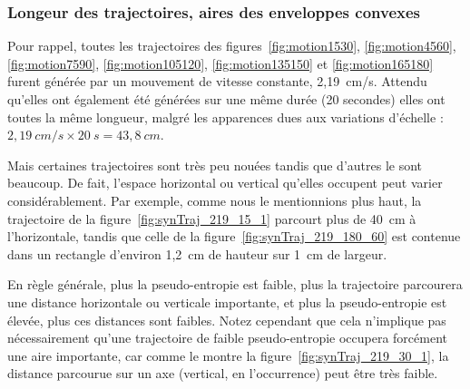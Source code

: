 	\subsubsection{Longeur des trajectoires, aires des enveloppes convexes}
	Pour rappel, toutes les trajectoires des figures~\ref{fig:motion1530}, \ref{fig:motion4560}, \ref{fig:motion7590}, \ref{fig:motion105120}, \ref{fig:motion135150} et \ref{fig:motion165180} furent générée par un mouvement de vitesse constante, 2,19~cm/s. Attendu qu'elles ont également été générées sur une même durée (20 secondes) elles ont toutes la même longueur, malgré les apparences dues aux variations d'échelle : $2,19~cm/s \times 20~s = 43,8~cm$.
	
	Mais certaines trajectoires sont très peu \og nouées \fg{} tandis que d'autres le sont beaucoup. De fait, l'espace horizontal ou vertical qu'elles occupent peut varier considérablement. Par exemple, comme nous le mentionnions plus haut,	la trajectoire de la figure~\ref{fig:synTraj_219_15_1} parcourt plus de 40~cm à l'horizontale, tandis que celle de la figure~\ref{fig:synTraj_219_180_60} est contenue dans un rectangle d'environ 1,2~cm de hauteur sur 1~cm de largeur.
	
	En règle générale, plus la pseudo-entropie est faible, plus la trajectoire parcourera une distance horizontale ou verticale importante, et plus la pseudo-entropie est élevée, plus ces distances sont faibles. Notez cependant que cela n'implique pas nécessairement qu'une trajectoire de faible pseudo-entropie occupera forcément une aire importante, car comme le montre la figure~\ref{fig:synTraj_219_30_1}, la distance parcourue sur un axe (vertical, en l'occurrence) peut être très faible.
	

